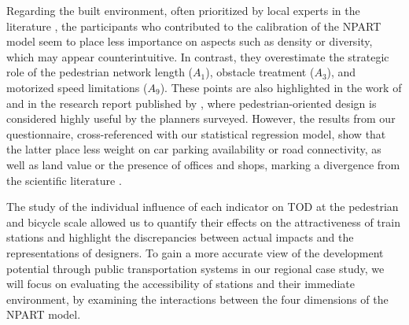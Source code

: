 \begin{refsegment}
Regarding the built environment, often prioritized by local experts in the literature \textcolor{blue}{\autocite[41]{lukman_development_2014}}, the participants who contributed to the calibration of the \acrshort{NPART} model seem to place less importance on aspects such as density or diversity, which may appear counterintuitive. In contrast, they overestimate the strategic role of the pedestrian network length (\(A_{1}\)), obstacle treatment (\(A_{3}\)), and motorized speed limitations (\(A_{9}\)). These points are also highlighted in the work of \textcolor{blue}{\textcite[2430]{kumar_developing_2020}} and in the research report published by \textcolor{blue}{\textcite[19]{transportation_research_board_transit-oriented_2005}}, where pedestrian-oriented design is considered highly useful by the planners surveyed. However, the results from our questionnaire, cross-referenced with our statistical regression model, show that the latter place less weight on car parking availability or road connectivity, as well as land value or the presence of offices and shops, marking a divergence from the scientific literature \textcolor{blue}{\autocites[19]{transportation_research_board_transit-oriented_2005}[42]{lukman_development_2014}[95]{caset_planning_2019}}.%

The study of the individual influence of each indicator on \acrshort{TOD} at the pedestrian and bicycle scale allowed us to quantify their effects on the attractiveness of train stations and highlight the discrepancies between actual impacts and the representations of designers. To gain a more accurate view of the development potential through public transportation systems in our regional case study, we will focus on evaluating the accessibility of stations and their immediate environment, by examining the interactions between the four dimensions of the \acrshort{NPART} model.%


\end{refsegment}
